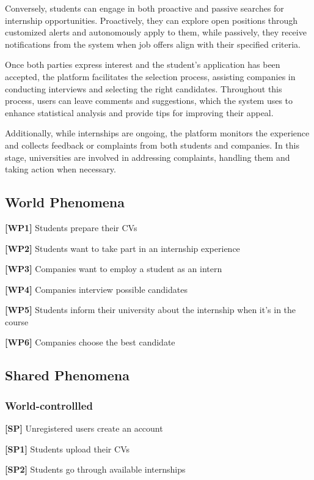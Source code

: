 Conversely, students can engage in both proactive and passive searches for internship opportunities. Proactively, they can explore open positions through customized alerts and autonomously apply to them, while passively, they receive notifications from the system when job offers align with their specified criteria.

Once both parties express interest and the student's application has been accepted, the platform facilitates the selection process, assisting companies in conducting interviews and selecting the right candidates. Throughout this process, users can leave comments and suggestions, which the system uses to enhance statistical analysis and provide tips for improving their appeal.

Additionally, while internships are ongoing, the platform monitors the experience and collects feedback or complaints from both students and companies. In this stage, universities are involved in addressing complaints, handling them and taking action when necessary.

\subsection{World Phenomena}
\textbf{[WP1]} Students prepare their CVs

\textbf{[WP2]} Students want to take part in an internship experience 

\textbf{[WP3]} Companies want to employ a student as an intern 

\textbf{[WP4]} Companies interview possible candidates 

\textbf{[WP5]} Students inform their university about the internship when it's in the course

\textbf{[WP6]} Companies choose the best candidate

\subsection{Shared Phenomena}

\subsubsection{World-controllled}

\textbf{[SP]} Unregistered users create an account

\textbf{[SP1]} Students upload their CVs

\textbf{[SP2]} Students go through available internships

